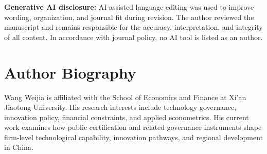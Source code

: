 \documentclass[12pt]{article}
\begin{document}
\noindent\textbf{Generative AI disclosure:} AI-assisted language editing was used to improve wording, organization, and journal fit during revision. The author reviewed the manuscript and remains responsible for the accuracy, interpretation, and integrity of all content. In accordance with journal policy, no AI tool is listed as an author.

\section*{Author Biography}

Wang Weijia is affiliated with the School of Economics and Finance at Xi'an Jiaotong University. His research interests include technology governance, innovation policy, financial constraints, and applied econometrics. His current work examines how public certification and related governance instruments shape firm-level technological capability, innovation pathways, and regional development in China.
\end{document}
